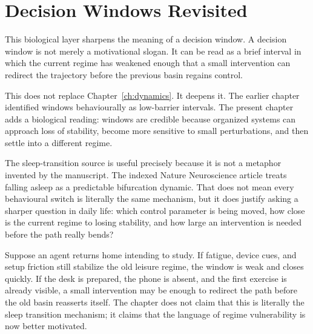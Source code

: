 \section{Decision Windows Revisited}

This biological layer sharpens the meaning of a decision window. A decision
window is not merely a motivational slogan. It can be read as a brief interval
in which the current regime has weakened enough that a small intervention can
redirect the trajectory before the previous basin regains control.

\begin{discussion}
This does not replace Chapter~\ref{ch:dynamics}. It deepens it. The earlier
chapter identified windows behaviourally as low-barrier intervals. The present
chapter adds a biological reading: windows are credible because organized
systems can approach loss of stability, become more sensitive to small
perturbations, and then settle into a different regime.
\end{discussion}

\begin{example}
The sleep-transition source is useful precisely because it is not a metaphor
invented by the manuscript. The indexed Nature Neuroscience article treats
falling asleep as a predictable bifurcation dynamic. That does not mean every
behavioural switch is literally the same mechanism, but it does justify asking
a sharper question in daily life: which control parameter is being moved, how
close is the current regime to losing stability, and how large an intervention
is needed before the path really bends?
\end{example}

\begin{example}
Suppose an agent returns home intending to study. If fatigue, device cues, and
setup friction still stabilize the old leisure regime, the window is weak and
closes quickly. If the desk is prepared, the phone is absent, and the first
exercise is already visible, a small intervention may be enough to redirect
the path before the old basin reasserts itself. The chapter does not claim
that this is literally the sleep transition mechanism; it claims that the
language of regime vulnerability is now better motivated.
\end{example}
